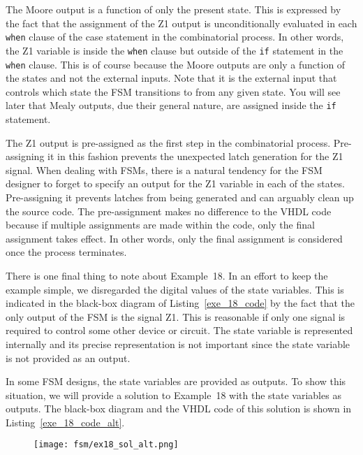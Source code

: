 \begin{my_list}
\item The Moore output is a function of only the present state. This is expressed by the fact that the assignment of the Z1 output is unconditionally evaluated in each \texttt{when} clause of the case statement in the combinatorial process. In other words, the Z1 variable is inside the \texttt{when} clause but outside of the \texttt{if} statement in the \texttt{when} clause. This is of course because the Moore outputs are only a function of the states and not the external inputs. Note that it is the external input that controls which state the FSM transitions to from any given state. You will see later that Mealy outputs, due their general nature, are assigned inside the \texttt{if} statement.

\item The Z1 output is pre-assigned as the first step in the combinatorial process. Pre-assigning it in this fashion prevents the unexpected latch generation for the Z1 signal. When dealing with FSMs, there is a natural tendency for the FSM designer to forget to specify an output for the Z1 variable in each of the states. Pre-assigning it prevents latches from being generated and can arguably clean up the source code. The pre-assignment makes no difference to the VHDL code because if multiple assignments are made within the code, only the final assignment takes effect. In other words, only the final assignment is considered once the process terminates. 
\end{my_list}

There is one final thing to note about Example~18. In an effort to keep the example simple, we disregarded the digital values of the state variables. This is indicated in the black-box diagram of Listing~\ref{exe_18_code} by the fact that the only output of the FSM is the signal Z1. This is reasonable if only one signal is required to control some other device or circuit. The state variable is represented internally and its precise representation is not important since the state variable is not provided as an output. 

In some FSM designs, the state variables are provided as outputs. To show this situation, we will provide a solution to Example~18 with the state variables as outputs. The black-box diagram and the VHDL code of this solution is shown in Listing~\ref{exe_18_code_alt}.
\begin{figure}[!h]
    \centering
	\texttt{[image: fsm/ex18\_sol\_alt.png]}
\end{figure}

